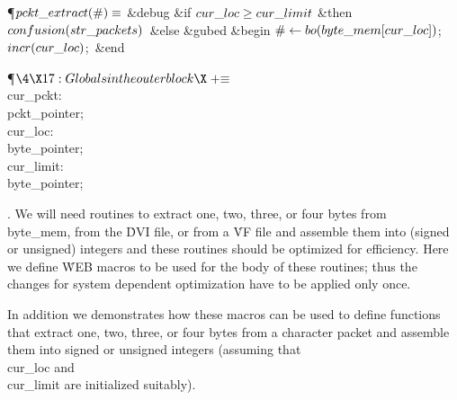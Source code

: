 \Y\P\D {}$\\{pckt\_extract}(\#)\S$\1\6
\&{debug} \&{if} $\\{cur\_loc}\G\\{cur\_limit}$ \1\&{then}\5
$\\{confusion}(\\{str\_packets})$\ \&{else} \2\6
\&{gubed}\2\6
\&{begin} $\#\K\\{bo}(\\{byte\_mem}[\\{cur\_loc}])$;\5
$\\{incr}(\\{cur\_loc})$;\ \&{end}\par
\Y\P$\4\X17:Globals in the outer block\X\mathrel{+}\S$\6
\4\\{cur\_pckt}: \\{pckt\_pointer};\6
\4\\{cur\_loc}: \\{byte\_pointer};\6
\4\\{cur\_limit}: \\{byte\_pointer};\par
\fi

. We will need routines to extract one, two, three, or four bytes from
\\{byte\_mem}, from the \.{DVI} file, or from a \.{VF} file and assemble
them into (signed or unsigned) integers and these routines should be
optimized for efficiency. Here we define \.{WEB} macros to be used for
the body of these routines; thus the changes for system dependent
optimization have to be applied only once.

In addition we demonstrates how these macros can be used to define
functions that extract one, two, three, or four bytes from a character
packet and assemble them into signed or unsigned integers (assuming that
\\{cur\_loc} and \\{cur\_limit} are initialized suitably).

